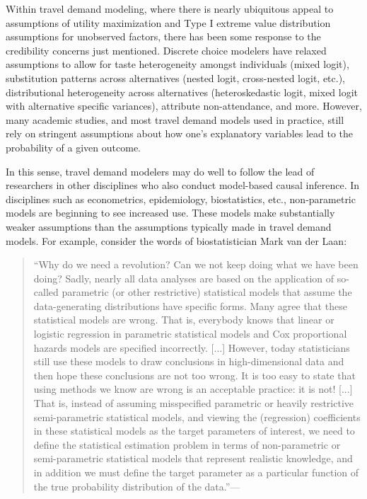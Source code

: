 Within travel demand modeling, where there is nearly ubiquitous appeal to assumptions of utility maximization and Type I extreme value distribution assumptions for unobserved factors, there has been some response to the credibility concerns just mentioned. Discrete choice modelers have relaxed assumptions to allow for taste heterogeneity amongst individuals (mixed logit), substitution patterns across alternatives (nested logit, cross-nested logit, etc.), distributional heterogeneity across alternatives (heteroskedastic logit, mixed logit with alternative specific variances), attribute non-attendance, and more. However, many academic studies, and most travel demand models used in practice, still rely on stringent assumptions about how one's explanatory variables lead to the probability of a given outcome.

In this sense, travel demand modelers may do well to follow the lead of researchers in other disciplines who also conduct model-based causal inference. In disciplines such as econometrics, epidemiology, biostatistics, etc., non-parametric models are beginning to see increased use. These models make substantially weaker assumptions than the assumptions typically made in travel demand models. For example, consider the words of biostatistician Mark van der Laan:
\begin{quotation}
``Why do we need a revolution? Can we not keep doing what we have been doing? Sadly, nearly all data analyses are based on the application of so-called parametric (or other restrictive) statistical models that assume the data-generating distributions have specific forms. Many agree that these statistical models are wrong. That is, everybody knows that linear or logistic regression in parametric statistical models and Cox proportional hazards models are specified incorrectly. [...] However, today statisticians still use these models to draw conclusions in high-dimensional data and then hope these conclusions are not too wrong. It is too easy to state that using methods we know are wrong is an acceptable practice: it is not! [...] That is, instead of assuming misspecified parametric or heavily restrictive semi-parametric statistical models, and viewing the (regression) coefficients in these statistical models as the target parameters of interest, we need to define the statistical estimation problem in terms of non-parametric or semi-parametric statistical models that represent realistic knowledge, and in addition we must define the target parameter as a particular function of the true probability distribution of the data.''---\citep{vanderlaan2011targed}
\end{quotation}

